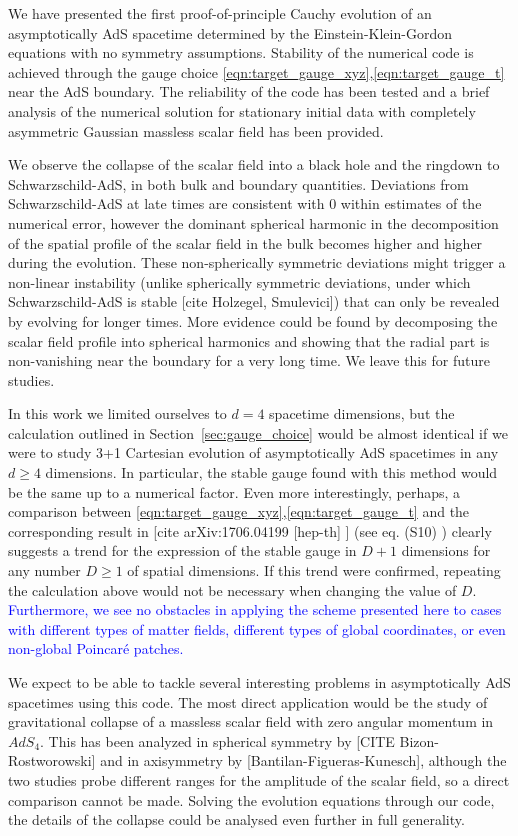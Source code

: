 \documentclass[a4paper,11pt]{article}
\numberwithin{equation}{section}
\begin{document}
We have presented the first proof-of-principle Cauchy evolution of an asymptotically AdS spacetime determined by the Einstein-Klein-Gordon equations with no symmetry assumptions. Stability of the numerical code is achieved through the gauge choice \eqref{eqn:target_gauge_xyz},\eqref{eqn:target_gauge_t} near the AdS boundary. The reliability of the code has been tested and a brief analysis of the numerical solution for stationary initial data with completely asymmetric Gaussian massless scalar field has been provided.

We observe the collapse of the scalar field into a black hole and the ringdown to Schwarzschild-AdS, in both bulk and boundary quantities.
Deviations from Schwarzschild-AdS at late times are consistent with 0 within estimates of the numerical error, however the dominant spherical harmonic in the decomposition of the spatial profile of the scalar field in the bulk becomes higher and higher during the evolution. These non-spherically symmetric deviations might trigger a non-linear instability (unlike spherically symmetric deviations, under which Schwarzschild-AdS is stable [cite Holzegel, Smulevici]) that can only be revealed by evolving for longer times. More evidence could be found by decomposing the scalar field profile into spherical harmonics and showing that the radial part is non-vanishing near the boundary for a very long time. We leave this for future studies.

In this work we limited ourselves to $d=4$ spacetime dimensions, but the calculation outlined in Section~\ref{sec:gauge_choice} would be almost identical if we were to study 3+1 Cartesian evolution of asymptotically AdS spacetimes in any $d\geq4$ dimensions. In particular, the stable gauge found with this method would be the same up to a numerical factor. Even more interestingly, perhaps, a comparison between \eqref{eqn:target_gauge_xyz},\eqref{eqn:target_gauge_t} and the corresponding result in [cite arXiv:1706.04199 [hep-th] ] (see eq. (S10) ) clearly suggests a trend for the expression of the stable gauge in $D+1$ dimensions for any number $D\geq1$ of spatial dimensions. If this trend were confirmed, repeating the calculation above would not be necessary when changing the value of $D$. \textcolor{blue}{Furthermore, we see no obstacles in applying the scheme presented here to cases with different types of matter fields, different types of global coordinates, or even non-global Poincar\'{e} patches.}

We expect to be able to tackle several interesting problems in asymptotically AdS spacetimes using this code. The most direct application would be the study of gravitational collapse of a massless scalar field with zero angular momentum in $AdS_4$. This has been analyzed in spherical symmetry by [CITE Bizon-Rostworowski] and in axisymmetry by [Bantilan-Figueras-Kunesch], although the two studies probe different ranges for the amplitude of the scalar field, so a direct comparison cannot be made. Solving the evolution equations through our code, the details of the collapse could be analysed even further in full generality.
\end{document}
